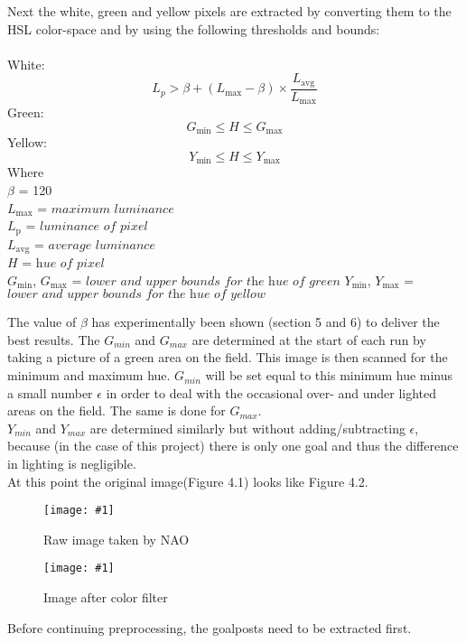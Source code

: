 \documentclass{ba-kecs}
\numberwithin{figure}{section}
\numberwithin{equation}{section}
\newcommand{\dkepic}[2]{ %
	\begin{figure}[H] %
	\texttt{[image: \#1]}
	\caption{#2}
	\label{#1}
	\end{figure}
}
\begin{document}
Next the white, green and yellow pixels are extracted by converting them to the HSL color-space and by using the following thresholds and bounds:\\ \\
White:
	\begin{equation}
	L_{p} > \beta + (L_{\mathrm{max}}-\beta) \times \frac{L_{\mathrm{avg}}}{L_{\mathrm{max}}} \label{whiteImgProc}
	\end{equation}
Green:
	\begin{equation}
	G_{\mathrm{min}} \leq H \leq G_{\mathrm{max}} \label{greenImgProc}
	\end{equation}
Yellow:
	\begin{equation}
	Y_{\mathrm{min}} \leq H \leq Y_{\mathrm{max}} \label{yellowImgProc}
	\end{equation}
Where \\
	$\beta$ = 120 \\
	$L_{\mathrm{max}}$ = $\textit{maximum luminance}$ \\
	$L_{\mathrm{p}}$ = $\textit{luminance of pixel}$ \\
	$L_{\mathrm{avg}}$ = $\textit{average luminance}$ \\
	$\textit{H}$ = $\textit{hue of pixel}$ \\
	$G_{\mathrm{min}}$, $G_{\mathrm{max}}$ = $\textit{lower and upper bounds for 		the hue of green}$
	$Y_{\mathrm{min}}$, $Y_{\mathrm{max}}$ = $\textit{lower and upper bounds for 		the hue of yellow}$
	
The value of $\beta$ has experimentally been shown (section 5 and 6) to deliver the best results. The $G_{min}$ and $G_{max}$ are determined at the start of each run by taking a picture of a green area on the field. This image is then scanned for the minimum and maximum hue. $G_{min}$ will be set equal to this minimum hue minus a small number $\epsilon$ in order to deal with the occasional over- and under lighted areas on the field. The same is done for $G_{max}$.\\
$Y_{min}$ and $Y_{max}$ are determined similarly but without adding/subtracting $\epsilon$, because (in the case of this project) there is only one goal and thus the difference in lighting is negligible.\\
At this point the original image(Figure 4.1) looks like Figure 4.2.\\
\dkepic{figure_IP1}{Raw image taken by NAO}
\dkepic{figure_IP2}{Image after color filter}
Before continuing preprocessing, the goalposts need to be extracted first.
\end{document}
